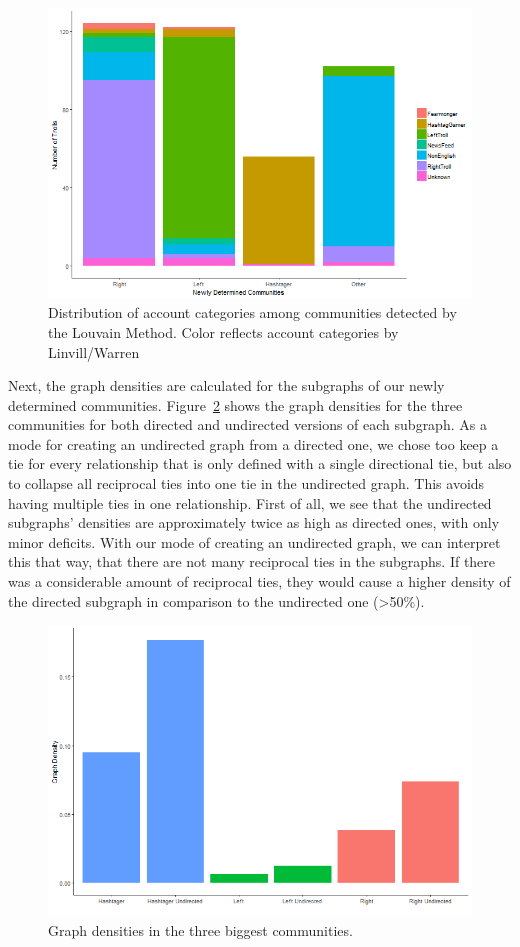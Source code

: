 \documentclass[12pt, titlepage=true, toc=bib]{scrartcl}
\begin{document}
\begin{figure}[!ht]
\centering
\includegraphics[width=0.95\linewidth]{final_figure2.png}%
\caption{Distribution of account categories among communities detected by the Louvain Method. Color reflects account categories by Linvill/Warren}
\label{fig:distcat}
\end{figure}

Next, the graph densities are calculated for the subgraphs of our newly determined communities. Figure~\ref{fig:dens} shows the graph densities for the three communities for both directed and undirected versions of each subgraph. As a mode for creating an undirected graph from a directed one, we chose too keep a tie for every relationship that is only defined with a single directional tie, but also to collapse all reciprocal ties into one tie in the undirected graph. This avoids having multiple ties in one relationship. First of all, we see that the undirected subgraphs' densities are approximately twice as high as directed ones, with only minor deficits. With our mode of creating an undirected graph, we can interpret this that way, that there are not many reciprocal ties in the subgraphs. If there was a considerable amount of reciprocal ties, they would cause a higher density of the directed subgraph in comparison to the undirected one (>50\%).

\begin{figure}[!ht]
\centering
\includegraphics[width=0.95\linewidth]{final_figure3.png}
\caption{Graph densities in the three biggest communities.}
\label{fig:dens}
\end{figure}
\end{document}
